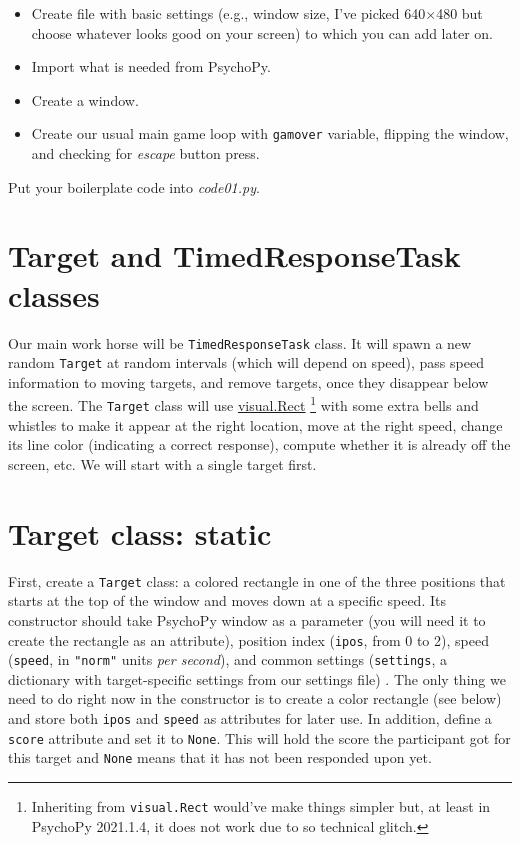 \documentclass[
]{book}
\providecommand{\tightlist}{%
  \setlength{\itemsep}{0pt}\setlength{\parskip}{0pt}}
\begin{document}
\begin{itemize}
\tightlist
\item
  Create file with basic settings (e.g., window size, I've picked 640×480 but choose whatever looks good on your screen) to which you can add later on.
\item
  Import what is needed from PsychoPy.
\item
  Create a window.
\item
  Create our usual main game loop with \texttt{gamover} variable, flipping the window, and checking for \emph{escape} button press.
\end{itemize}

Put your boilerplate code into \emph{code01.py}.

\hypertarget{target-and-timedresponsetask-classes}{%
\section{Target and TimedResponseTask classes}\label{target-and-timedresponsetask-classes}}

Our main work horse will be \texttt{TimedResponseTask} class. It will spawn a new random \texttt{Target} at random intervals (which will depend on speed), pass speed information to moving targets, and remove targets, once they disappear below the screen. The \texttt{Target} class will use \href{https://psychopy.org/api/visual/rect.html\#psychopy.visual.rect.Rect}{visual.Rect}
\footnote{Inheriting from \texttt{visual.Rect} would've make things simpler but, at least in PsychoPy 2021.1.4, it does not work due to so technical glitch.} with some extra bells and whistles to make it appear at the right location, move at the right speed, change its line color (indicating a correct response), compute whether it is already off the screen, etc. We will start with a single target first.

\hypertarget{target-class-static}{%
\section{Target class: static}\label{target-class-static}}

First, create a \texttt{Target} class: a colored rectangle in one of the three positions that starts at the top of the window and moves down at a specific speed. Its constructor should take PsychoPy window as a parameter (you will need it to create the rectangle as an attribute), position index (\texttt{ipos}, from 0 to 2), speed (\texttt{speed}, in \texttt{"norm"} units \emph{per second}), and common settings (\texttt{settings}, a dictionary with target-specific settings from our settings file) . The only thing we need to do right now in the constructor is to create a color rectangle (see below) and store both \texttt{ipos} and \texttt{speed} as attributes for later use. In addition, define a \texttt{score} attribute and set it to \texttt{None}. This will hold the score the participant got for this target and \texttt{None} means that it has not been responded upon yet.
\end{document}
